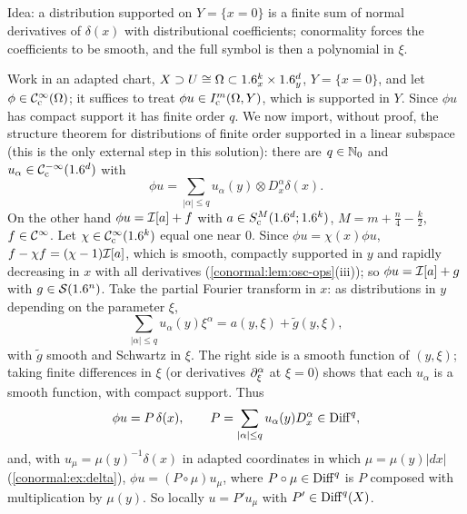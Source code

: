 \subsection*{}
Idea: a distribution supported on $Y=\{x=0\}$ is a finite sum of normal derivatives of
$\delta(x)$ with distributional coefficients; conormality forces the coefficients to be
smooth, and the full symbol is then a polynomial in $\xi$.

Work in an adapted chart, $X\supset U\cong\Omega\subset1.6^k_x\times1.6^d_y$, $Y=\{x=0\}$, and
let $\phi\in\mathcal{C}^\infty_{\mathrm{c}}(\Omega)$; it suffices to treat $\phi u\in I^{m}_{\mathrm c}(\Omega,Y)$, which is
supported in $Y$. Since $\phi u$ has compact support it has finite order $q$. We now import,
without proof, the structure theorem for distributions of finite order supported in a linear
subspace \cite[Theorem~2.3.5]{Hormander-I} (this is the only external step in this solution):
there are $q\in\mathbb{N}_0$ and $u_\alpha\in\mathcal{C}^{-\infty}_{\mathrm{c}}(1.6^d)$ with
\begin{equation*}
\phi u=\sum_{|\alpha|\le q}u_\alpha(y)\otimes D_x^\alpha\delta(x).
\end{equation*}
On the other hand $\phi u=\mathcal{I}[a]+f$ with $a\in S^M_{\mathrm c}(1.6^d;1.6^k)$, $M=m+\frac n4-
\frac k2$, $f\in\mathcal{C}^\infty$. Let $\chi\in\mathcal{C}^\infty_{\mathrm{c}}(1.6^k)$ equal one near $0$. Since $\phi u=\chi(x)\phi u$,
$f-\chi f=(\chi-1)\mathcal{I}[a]$, which is smooth, compactly supported in $y$ and rapidly decreasing
in $x$ with all derivatives (\cref{conormal:lem:osc-ops}(iii)); so $\phi u=\mathcal{I}[a]+g$ with
$g\in\mathcal{S}(1.6^n)$. Take the partial Fourier transform in $x$: as distributions in $y$
depending on the parameter $\xi$,
\begin{equation*}
\sum_{|\alpha|\le q}u_\alpha(y)\xi^\alpha=a(y,\xi)+\tilde g(y,\xi),
\end{equation*}
with $\tilde g$ smooth and Schwartz in $\xi$. The right side is a smooth function of
$(y,\xi)$; taking finite differences in $\xi$ (or derivatives $\partial_\xi^\alpha$ at $\xi=0$)
shows that each $u_\alpha$ is a smooth function, with compact support. Thus
\begin{equation*}
\phi u=P\,\delta(x),\qquad P=\sum_{|\alpha|\le q}u_\alpha(y)D_x^\alpha\in\operatorname{Diff}^{q},
\end{equation*}
and, with $u_\mu=\mu(y)^{-1}\delta(x)$ in adapted coordinates in which $\mu=\mu(y)|dx|$
(\cref{conormal:ex:delta}), $\phi u=(P\circ\mu)u_\mu$, where $P\circ\mu\in\operatorname{Diff}^{q}$ is $P$
composed with multiplication by $\mu(y)$. So locally $u=P'u_\mu$ with $P'\in\operatorname{Diff}^{q}(X)$.

